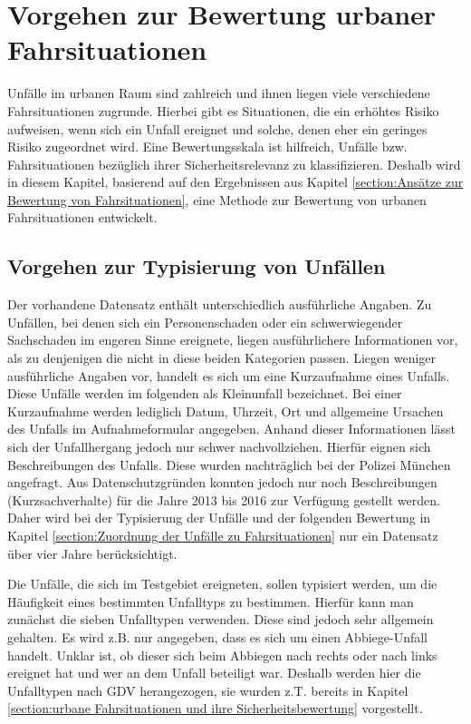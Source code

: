 \section{Vorgehen zur Bewertung urbaner Fahrsituationen}\label{section:Bewertung urbaner Fahrsituationen}
Unfälle im urbanen Raum sind zahlreich und ihnen liegen viele verschiedene Fahrsituationen zugrunde. Hierbei gibt es Situationen, die ein erhöhtes Risiko aufweisen, wenn sich ein Unfall ereignet und solche, denen eher ein geringes Risiko zugeordnet wird. Eine Bewertungsskala ist hilfreich, Unfälle bzw. Fahrsituationen bezüglich ihrer Sicherheitsrelevanz zu klassifizieren. Deshalb wird in diesem Kapitel, basierend auf den Ergebnissen aus Kapitel \ref{section:Ansätze zur Bewertung von Fahrsituationen}, eine Methode zur Bewertung von urbanen Fahrsituationen entwickelt.

\subsection{Vorgehen zur Typisierung von Unfällen}\label{subsection:Vorgehen zur Typisierung}
Der vorhandene Datensatz enthält unterschiedlich ausführliche Angaben. Zu Unfällen, bei denen sich ein Personenschaden oder ein schwerwiegender Sachschaden im engeren Sinne ereignete, liegen ausführlichere Informationen vor, als zu denjenigen die nicht in diese beiden Kategorien passen. Liegen weniger ausführliche Angaben vor, handelt es sich um eine Kurzaufnahme eines Unfalls. Diese Unfälle werden im folgenden als Kleinunfall bezeichnet. Bei einer Kurzaufnahme werden lediglich Datum, Uhrzeit, Ort und allgemeine Ursachen des Unfalls im Aufnahmeformular angegeben. Anhand dieser Informationen lässt sich der Unfallhergang jedoch nur schwer nachvollziehen. Hierfür eignen sich Beschreibungen des Unfalls. Diese wurden nachträglich bei der Polizei München angefragt. Aus Datenschutzgründen konnten jedoch nur noch Beschreibungen (Kurzsachverhalte) für die Jahre 2013 bis 2016 zur Verfügung gestellt werden. Daher wird bei der Typisierung der Unfälle und der folgenden Bewertung in Kapitel \ref{section:Zuordnung der Unfälle zu Fahrsituationen} nur ein Datensatz über vier Jahre berücksichtigt.

Die Unfälle, die sich im Testgebiet ereigneten, sollen typisiert werden, um die Häufigkeit eines bestimmten Unfalltyps zu bestimmen. Hierfür kann man zunächst die sieben Unfalltypen verwenden. Diese sind jedoch sehr allgemein gehalten. Es wird z.B. nur angegeben, dass es sich um einen Abbiege-Unfall handelt. Unklar ist, ob dieser sich beim Abbiegen nach rechts oder nach links ereignet hat und wer an dem Unfall beteiligt war. Deshalb werden hier die Unfalltypen nach GDV herangezogen, sie wurden z.T. bereits in Kapitel \ref{section:urbane Fahrsituationen und ihre Sicherheitsbewertung} vorgestellt. %

